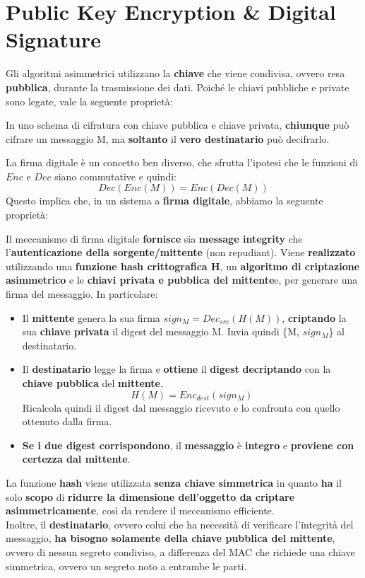 \section{Public Key Encryption \& Digital Signature}
Gli algoritmi asimmetrici utilizzano la \textbf{chiave} che viene condivisa, ovvero resa \textbf{pubblica}, durante la trasmissione dei dati. Poiché le chiavi pubbliche e private sono legate, vale la seguente proprietà:
\begin{proposition}
In uno schema di cifratura con chiave pubblica e chiave privata, \textbf{chiunque} può cifrare un messaggio M, ma \textbf{soltanto} il \textbf{vero destinatario} può decifrarlo.
\end{proposition}
La firma digitale è un concetto ben diverso, che sfrutta l'ipotesi che le funzioni di $Enc$ e $Dec$ siano commutative e quindi:
\begin{equation}\label{eq:commut}
    Dec(Enc(M)) = Enc(Dec(M))
\end{equation}
Questo implica che, in un sistema a \textbf{firma digitale}, abbiamo la seguente proprietà:
\begin{proposition}
Il meccanismo di firma digitale \textbf{fornisce} sia\textbf{ message integrity} che l’\textbf{autenticazione della sorgente/mittente} (non repudiant). Viene \textbf{realizzato} utilizzando una \textbf{funzione hash crittografica H}, un \textbf{algoritmo di criptazione asimmetrico} e le \textbf{chiavi privata e pubblica del mittente}e, per generare una firma del messaggio. In particolare:
\begin{itemize}
    \item Il \textbf{mittente} genera la sua firma $sign_M=Dec_{src}(H(M))$, \textbf{criptando} la sua \textbf{chiave privata} il digest del messaggio M. Invia quindi \{M, $sign_M$\} al destinatario.
    \item Il \textbf{destinatario} legge la firma e \textbf{ottiene} il \textbf{digest} \textbf{decriptando} con la \textbf{chiave pubblica} del \textbf{mittente}.
    \[H(M)=Enc_{dest}(sign_M)\]
    Ricalcola quindi il digest dal messaggio ricevuto e lo confronta con quello ottenuto dalla firma.
    \item \textbf{Se i due digest corrispondono}, il \textbf{messaggio} è \textbf{integro} e \textbf{proviene con certezza dal mittente}.
\end{itemize}
\end{proposition}
\begin{note}
La funzione \textbf{hash} viene utilizzata\textbf{ senza chiave simmetrica} in quanto \textbf{ha} il solo \textbf{scopo} di \textbf{ridurre la dimensione dell’oggetto da criptare asimmetricamente}, così da rendere il meccanismo efficiente.\\
Inoltre, il \textbf{destinatario}, ovvero colui che ha necessità di verificare l’integrità del messaggio, \textbf{ha bisogno solamente della chiave pubblica del mittente}, ovvero di nessun segreto condiviso, a differenza del MAC che richiede una chiave simmetrica, ovvero un segreto noto a entrambe le parti.
\end{note}
